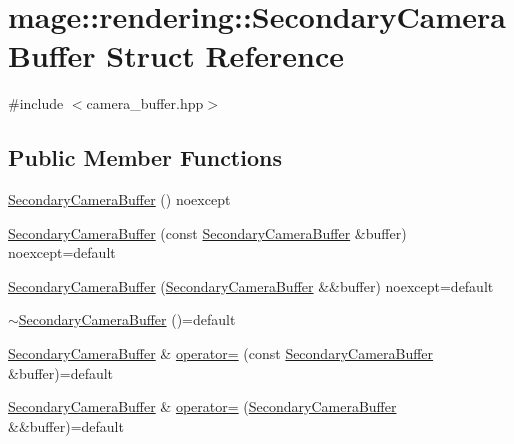 \hypertarget{structmage_1_1rendering_1_1_secondary_camera_buffer}{}\section{mage\+:\+:rendering\+:\+:Secondary\+Camera\+Buffer Struct Reference}
\label{structmage_1_1rendering_1_1_secondary_camera_buffer}


{\ttfamily \#include $<$camera\+\_\+buffer.\+hpp$>$}

\subsection*{Public Member Functions}
\begin{DoxyCompactItemize}
\item 
\hyperlink{structmage_1_1rendering_1_1_secondary_camera_buffer_a296dad06794aeb4017c37d3aa8eb9641}{Secondary\+Camera\+Buffer} () noexcept
\item 
\hyperlink{structmage_1_1rendering_1_1_secondary_camera_buffer_a8f1945d8c623d5ac685ff8fbaeffd09c}{Secondary\+Camera\+Buffer} (const \hyperlink{structmage_1_1rendering_1_1_secondary_camera_buffer}{Secondary\+Camera\+Buffer} \&buffer) noexcept=default
\item 
\hyperlink{structmage_1_1rendering_1_1_secondary_camera_buffer_a72efd73a7db74ad11f12c720b557cf0e}{Secondary\+Camera\+Buffer} (\hyperlink{structmage_1_1rendering_1_1_secondary_camera_buffer}{Secondary\+Camera\+Buffer} \&\&buffer) noexcept=default
\item 
\hyperlink{structmage_1_1rendering_1_1_secondary_camera_buffer_a0ee38cfcaf0cb5961ffc1c37fcb71b3f}{$\sim$\+Secondary\+Camera\+Buffer} ()=default
\item 
\hyperlink{structmage_1_1rendering_1_1_secondary_camera_buffer}{Secondary\+Camera\+Buffer} \& \hyperlink{structmage_1_1rendering_1_1_secondary_camera_buffer_ad26ba75c577c29c131aeab66a22444bd}{operator=} (const \hyperlink{structmage_1_1rendering_1_1_secondary_camera_buffer}{Secondary\+Camera\+Buffer} \&buffer)=default
\item 
\hyperlink{structmage_1_1rendering_1_1_secondary_camera_buffer}{Secondary\+Camera\+Buffer} \& \hyperlink{structmage_1_1rendering_1_1_secondary_camera_buffer_ae559ef0e3a2c5e01963fa744a427cdc7}{operator=} (\hyperlink{structmage_1_1rendering_1_1_secondary_camera_buffer}{Secondary\+Camera\+Buffer} \&\&buffer)=default
\end{DoxyCompactItemize}
